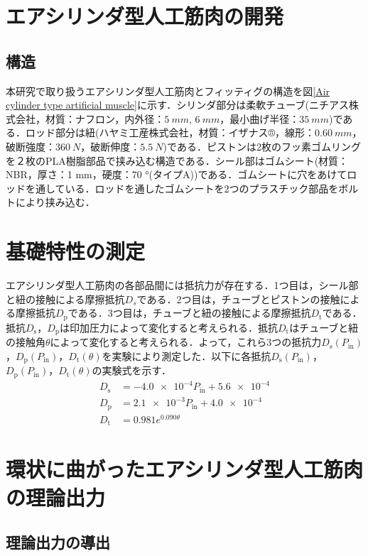 \section{エアシリンダ型人工筋肉の開発}%
\subsection{構造}%
本研究で取り扱うエアシリンダ型人工筋肉とフィッティグの構造を図\ref{Air cylinder type artificial muscle}に示す．シリンダ部分は柔軟チューブ(ニチアス株式会社，材質：ナフロン\textregistered，内外径：$\SI{5}{mm}$, $\SI{6}{mm}$，最小曲げ半径：$\SI{35}{mm}$)である．ロッド部分は紐(ハヤミ工産株式会社，材質：イザナス®，線形：$\SI{0.60}{mm}$，破断強度：$\SI{360}{N}$，破断伸度：$\SI{5.5}{N}$)である．ピストンは2枚のフッ素ゴムリングを２枚のPLA樹脂部品で挟み込む構造である．シール部はゴムシート(材質：NBR，厚さ：1 mm，硬度：70 °(タイプA))である．ゴムシートに穴をあけてロッドを通している．ロッドを通したゴムシートを2つのプラスチック部品をボルトにより挟み込む．

\section{基礎特性の測定}%
エアシリンダ型人工筋肉の各部品間には抵抗力が存在する．1つ目は，シール部と紐の接触による摩擦抵抗$D_s$である．2つ目は，チューブとピストンの接触による摩擦抵抗$D_\mathrm{p}$である．3つ目は，チューブと紐の接触による摩擦抵抗$D_\mathrm{t}$である．抵抗$D_\mathrm{s}$，$D_\mathrm{p}$は印加圧力によって変化すると考えられる．抵抗$D_\mathrm{t}$はチューブと紐の接触角$\theta$によって変化すると考えられる．よって，これら3つの抵抗力$D_\mathrm{s}(P_\mathrm{in})$，$D_\mathrm{p}(P_\mathrm{in})$，$D_\mathrm{t}(\theta)$を実験により測定した．以下に各抵抗$D_\mathrm{s}(P_\mathrm{in})$，$D_\mathrm{p}(P_\mathrm{in})$，$D_\mathrm{t}(\theta)$の実験式を示す．
\begin{align}
  D_\mathrm{s} & = \num{-4.0e-4}P_\mathrm{in} + \num{5.6e-4} \\
  D_\mathrm{p} & = \num{2.1e-3}P_\mathrm{in} + \num{4.0e-4}  \\
  D_\mathrm{t} & = 0.981e^{0.090\theta}
\end{align}


\section{環状に曲がったエアシリンダ型人工筋肉の理論出力}%
\subsection{理論出力の導出}%

